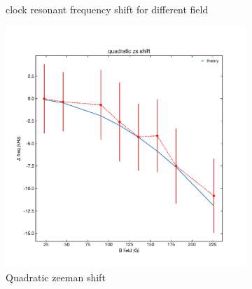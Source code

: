 \documentclass[bibnotes]{article}
\begin{document}
\begin{figure}
\begin{subfigure}{0.4\linewidth}
		    \caption{clock resonant frequency shift for different field}
		\end{subfigure}
		\begin{subfigure}{0.4\linewidth}
		    \includegraphics[scale=0.4]{figures/quadratic_zeeman_shift.pdf}
		    \caption{Quadratic zeeman shift}
		\end{subfigure}
		\caption{}
		\end{figure}



\end{document}
